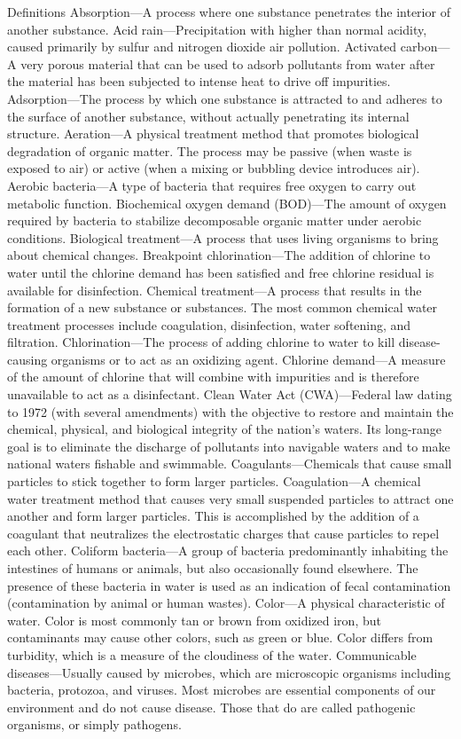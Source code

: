 \documentclass{article}
\begin{document}
Definitions Absorption---A process where one substance penetrates the
interior of another substance. Acid rain---Precipitation with higher
than normal acidity, caused primarily by sulfur and nitrogen dioxide air
pollution. Activated carbon---A very porous material that can be used to
adsorb pollutants from water after the material has been subjected to
intense heat to drive off impurities. Adsorption---The process by which
one substance is attracted to and adheres to the surface of another
substance, without actually penetrating its internal structure.
Aeration---A physical treatment method that promotes biological
degradation of organic matter. The process may be passive (when waste is
exposed to air) or active (when a mixing or bubbling device introduces
air). Aerobic bacteria---A type of bacteria that requires free oxygen to
carry out metabolic function. Biochemical oxygen demand (BOD)---The
amount of oxygen required by bacteria to stabilize decomposable organic
matter under aerobic conditions. Biological treatment---A process that
uses living organisms to bring about chemical changes. Breakpoint
chlorination---The addition of chlorine to water until the chlorine
demand has been satisfied and free chlorine residual is available for
disinfection. Chemical treatment---A process that results in the
formation of a new substance or substances. The most common chemical
water treatment processes include coagulation, disinfection, water
softening, and filtration. Chlorination---The process of adding chlorine
to water to kill disease-causing organisms or to act as an oxidizing
agent. Chlorine demand---A measure of the amount of chlorine that will
combine with impurities and is therefore unavailable to act as a
disinfectant. Clean Water Act (CWA)---Federal law dating to 1972 (with
several amendments) with the objective to restore and maintain the
chemical, physical, and biological integrity of the nation's waters. Its
long-range goal is to eliminate the discharge of pollutants into
navigable waters and to make national waters fishable and swimmable.
Coagulants---Chemicals that cause small particles to stick together to
form larger particles. Coagulation---A chemical water treatment method
that causes very small suspended particles to attract one another and
form larger particles. This is accomplished by the addition of a
coagulant that neutralizes the electrostatic charges that cause
particles to repel each other. Coliform bacteria---A group of bacteria
predominantly inhabiting the intestines of humans or animals, but also
occasionally found elsewhere. The presence of these bacteria in water is
used as an indication of fecal contamination (contamination by animal or
human wastes). Color---A physical characteristic of water. Color is most
commonly tan or brown from oxidized iron, but contaminants may cause
other colors, such as green or blue. Color differs from turbidity, which
is a measure of the cloudiness of the water. Communicable
diseases---Usually caused by microbes, which are microscopic organisms
including bacteria, protozoa, and viruses. Most microbes are essential
components of our environment and do not cause disease. Those that do
are called pathogenic organisms, or simply pathogens.
\end{document}
